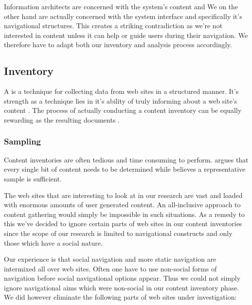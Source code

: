 Information architects are concerned with
the system's content and
We on the other hand are actually concerned with the system interface and
specifically it's navigational structures. This creates a striking
contradiction as we're not interested in content unless it can help or
guide users during their navigation. We therefore have to adapt
both our inventory and analysis process accordingly.

\subsection{Inventory}

A  is a technique for collecting data from web sites
in a structured manner. It's strength as a technique lies in it's ability of
truly informing about a web site's content \citep{wodtke02}. The process of
actually conducting a content inventory can be equally rewarding as the
resulting documents \citep{veen02}.

\subsubsection{Sampling}
\label{section:methodology.content.analysis.sampling}

Content inventories are often tedious and time consuming to perform.
\citet[p.~267]{wodtke02} argues that every single bit of content needs to be
determined while \citet[p.~241]{morville06} believes a representative sample
is sufficient.

The web sites that are interesting to look at in our research are vast and
loaded with enormous amounts of user generated content. An all-inclusive
approach to content gathering would simply be impossible in such situations.
As a remedy to this we've decided to ignore certain parts of web sites in our
content inventories since the scope of our research is limited to navigational
constructs and only those which have a social nature.

Our experience is that social navigation and more static navigation are
intermixed all over web sites. Often one have to use non-social forms of
navigation before social navigational options appear. Thus we could not simply
ignore navigational aims which were non-social in our content inventory phase.
We did however eliminate the following parts of web sites under investigation:

